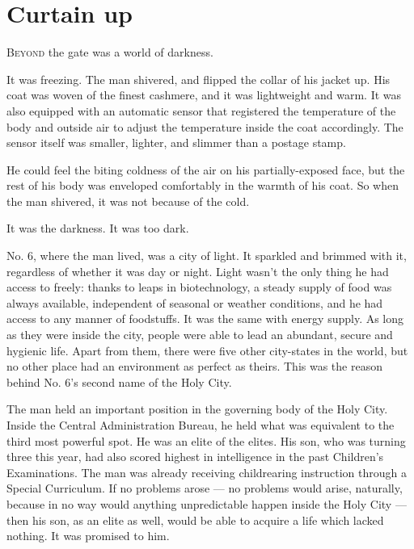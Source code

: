 
\chapter{Curtain up}


\lettrine{B}{eyond} the gate was a world of darkness.

It was freezing. The man shivered, and flipped the collar of his jacket
up. His coat was woven of the finest cashmere, and it was lightweight
and warm. It was also equipped with an automatic sensor that registered
the temperature of the body and outside air to adjust the temperature
inside the coat accordingly. The sensor itself was smaller, lighter, and
slimmer than a postage stamp.

He could feel the biting coldness of the air on his partially-exposed
face, but the rest of his body was enveloped comfortably in the warmth
of his coat. So when the man shivered, it was not because of the cold.

It was the darkness. It was too dark.

No. 6, where the man lived, was a city of light. It sparkled and brimmed
with it, regardless of whether it was day or night. Light wasn't the
only thing he had access to freely: thanks to leaps in biotechnology, a
steady supply of food was always available, independent of seasonal or
weather conditions, and he had access to any manner of foodstuffs. It
was the same with energy supply. As long as they were inside the city,
people were able to lead an abundant, secure and hygienic life. Apart
from them, there were five other city-states in the world, but no other
place had an environment as perfect as theirs. This was the reason
behind No. 6's second name of the Holy City.

The man held an important position in the governing body of the Holy
City. Inside the Central Administration Bureau, he held what was
equivalent to the third most powerful spot. He was an elite of the
elites. His son, who was turning three this year, had also scored
highest in intelligence in the past Children's Examinations. The man was
already receiving childrearing instruction through a Special Curriculum.
If no problems arose --- no problems would arise, naturally, because in no
way would anything unpredictable happen inside the Holy City --- then his
son, as an elite as well, would be able to acquire a life which lacked
nothing. It was promised to him.

